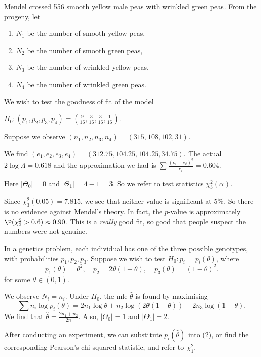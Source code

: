 \documentclass[a4paper]{article}
\begin{document}
\begin{eg}
  Mendel crossed 556 smooth yellow male peas with wrinkled green peas. From the progeny, let
  \begin{enumerate}
    \item $N_1$ be the number of smooth yellow peas,
    \item $N_2$ be the number of smooth green peas,
    \item $N_3$ be the number of wrinkled yellow peas,
    \item $N_4$ be the number of wrinkled green peas.
  \end{enumerate}
  We wish to test the goodness of fit of the model
  \begin{center}
    $H_0: (p_1, p_2, p_3, p_4) = \left(\frac{9}{16}, \frac{3}{16}, \frac{3}{16}, \frac{1}{16}\right)$.
  \end{center}
  Suppose we observe $(n_1, n_2, n_3, n_4) = (315, 108, 102, 31)$.

  We find $(e_1, e_2, e_3, e_4) = (312.75, 104.25, 104.25, 34.75)$. The actual $2\log \Lambda = 0.618$ and the approximation we had is $\sum \frac{(o_i - e_i)^2}{e_i} = 0.604$.

  Here $|\Theta_0| = 0$ and $|\Theta_1| = 4 - 1 = 3$. So we refer to test statistics $\chi_3^2(\alpha)$.

  Since $\chi_3^2(0.05) = 7.815$, we see that neither value is significant at $5\%$. So there is no evidence against Mendel's theory. In fact, the $p$-value is approximately $\P(\chi_3^2 > 0.6) \approx 0.90$. This is a \emph{really} good fit, so good that people suspect the numbers were not genuine.
\end{eg}

\begin{eg}
  In a genetics problem, each individual has one of the three possible genotypes, with probabilities $p_1, p_2, p_3$. Suppose we wish to test $H_0: p_i = p_i(\theta)$, where
  \[
    p_1(\theta) = \theta^2,\quad p_2 = 2\theta(1 - \theta), \quad p_3(\theta) = (1 - \theta)^2.
  \]
  for some $\theta \in (0, 1)$.

  We observe $N_i = n_i$. Under $H_0$, the mle $\hat{\theta}$ is found by maximising
  \[
    \sum n_i \log p_i(\theta) = 2n_1 \log \theta + n_2\log(2\theta(1 - \theta)) + 2n_3 \log (1 - \theta).
  \]
  We find that $\hat{\theta} = \frac{2n_1 + n_2}{2n}$. Also, $|\Theta_0| = 1$ and $|\Theta_1| = 2$.

  After conducting an experiment, we can substitute $p_i(\hat{\theta})$ into (2), or find the corresponding Pearson's chi-squared statistic, and refer to $\chi_1^2$.
\end{eg}
\end{document}
